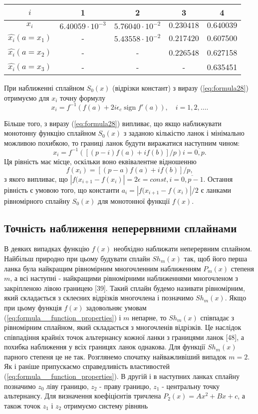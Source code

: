 \documentclass[ukrainian,14pt]{extarticle}
\newcommand{\sign}{\operatorname{sign}}
\begin{document}
\bgroup
\def\arraystretch{1.5}
\begin{center}
\begin{tabular}{ c | c |
c | c | c }
 $i$ & 1 & 2 & 3 & 4 \\
 \hline
 $x_i$ & $6.40059 \cdot 10^{-3}$ & $5.76040 \cdot 10^{-2}$ & $0.230418$ & $0.640039$ \\  
 \hline
  $\hat{x_i} (a = x_1)$ & - & $5.43558 \cdot 10^{-2}$ & 0.217420 & 0.607500 \\  
 \hline
 $\hat{x_i} (a = x_2)$ & - & - & 0.226548 & 0.627158   \\
 \hline
   $\hat{x_i} (a = x_3)$ & - & - & - & 0.635451 \\  
\end{tabular}
\end{center}
\egroup

При наближенні сплайном $S_0(x)$ (відрізки констант) з виразу (\ref{eq:formula28}) отримуємо для $x_i$ точну формулу
$$x_i = f^{-1} (f(a) + 2i\epsilon_c \sign{f'(a)}), \quad i = 1,2, \ldots .$$

Більше того, з виразу (\ref{eq:formula28}) випливає, що якщо наближувати монотонну функцію сплайном $S_0(x)$ з заданою кількістю ланок і мінімально можливою похибкою, то границі ланок будути виражатися наступним чином:
$$x_i = f^{-1}([(p - i)f(a) + if(b)] / p) i = \overline{0, p}.$$
Ця рівність має місце, оскільки воно еквівалентне відношенню 
$$f(x_i) = [(p-a)f(a) + if(b)]/p,$$
з якого випливає, що $|f(x_{i+1} - f(x_i)| = 2\epsilon = const, i = \overline{0, p-1}$. Остання рівність є умовою того, що константи $a_i = |f(x_{i+1}- f(x_i)| / 2$ є ланками рівномірного сплайну $S_0(x)$ для монотонної функції $f(x)$.

\subsection{Точність наближення неперервними сплайнами}

В деяких випадках функцію $f(x)$ необхідно наближати неперервним сплайном. Найбільш природно при цьому будувати сплайн $S h_m(x)$ так, щоб його перша ланка була найкращим рівномірним многочленним наближенням $P_m(x)$ степеня $m$, а всі наступні - найкращими рівномірними наближеннями многочленом з закріпленою лівою границею [39]. Такий сплайн будемо називати рівномірним, який складається з склеєних відрізків многочлена і позначимо $S h_m(x)$. Якщо при цьому функція $f(x)$ задовольняє умовам (\ref{eq:formula__function_properties}) і $m$ непарне, то $S h_m(x)$ співпадає з рівномірним сплайном, який складається з многочленів відрізків. Це наслідок співпадіння крайніх точок альтернансу кожної ланки з границями ланок [48], а похибка наближення у всіх границях ланок однакова. Для функції $S h_m(x)$ парного степеня це не так. Розглянемо спочатку найважливіший випадок $m = 2$. Як і раніше припускаємо справедливість властивостей (\ref{eq:formula__function_properties}).  В другій і в наступних ланках сплайну позначимо $z_0$ ліву границю, $z_2$ - праву границю, $z_1$ - центральну точку альтернансу. Для визначення коефіцієнтів тричлена $P_2(x) = Ax^2 + Bx + c$, а також точок $z_1$ і $z_2$ отримуємо систему рівнянь
\end{document}
